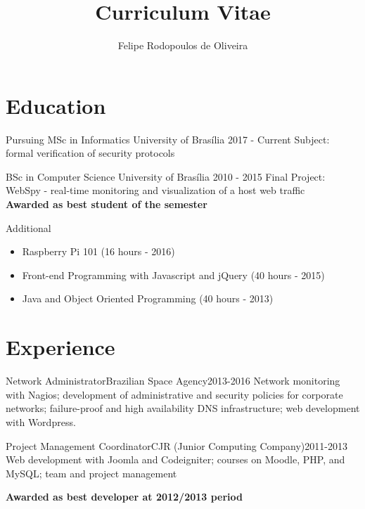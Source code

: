 \documentclass{cv}
\title{Curriculum Vitae}
\author{Felipe Rodopoulos de Oliveira}
\begin{document}
  \maketitle

  \section{Education}
  \begin{chronoitem}
    {Pursuing MSc in Informatics} {University of Brasília} {2017 - Current}
    Subject: formal verification of security protocols
  \end{chronoitem}

  \begin{chronoitem}
    {BSc in Computer Science} {University of Brasília} {2010 - 2015}
    Final Project: WebSpy - real-time monitoring and visualization of a host web traffic \\
    \textbf{Awarded as best student of the semester}
  \end{chronoitem}

  \begin{chronoitem}
    {Additional}{}{}
    \begin{itemize}
      \item[] Raspberry Pi 101 \hfill (16 hours - 2016)
      \item[] Front-end Programming with Javascript and jQuery \hfill (40 hours - 2015)
      \item[] Java and Object Oriented Programming \hfill (40 hours - 2013)
    \end{itemize}
  \end{chronoitem}
  \vspace{-.5cm}

  \section{Experience}
  \begin{chronoitem}
    {Network Administrator}{Brazilian Space Agency}{2013-2016}
    Network monitoring with Nagios; development of administrative and security policies for corporate networks; failure-proof and high availability DNS infrastructure; web development with Wordpress.
  \end{chronoitem}

  \begin{chronoitem}
    {Project Management Coordinator}{CJR (Junior Computing Company)}{2011-2013}
    Web development with Joomla and Codeigniter; courses on Moodle, PHP, and MySQL; team and project management \par
    \textbf{Awarded as best developer at 2012/2013 period}
  \end{chronoitem}
  \vspace{-.5cm}
\end{document}
